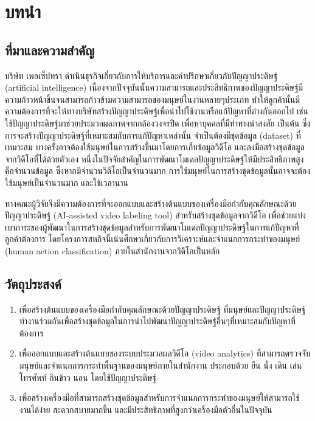 \chapter{บทนำ}
\section{ที่มาและความสำคัญ}
บริษัท เพอเซ็ปทรา ดำเนินธุรกิจเกี่ยวกับการให้บริการและคำปรึกษาเกี่ยวกับปัญญาประดิษฐ์ (artificial intelligence)
เนื่องจากปัจจุบันนั้นความสามารถและประสิทธิภาพของปัญญาประดิษฐ์มีความก้าวหน้าขึ้นจนสามารถก้าวข้ามความสามารถของมนุษย์ในงานหลายๆประเภท
ทำให้ลูกค้านั้นมีความต้องการที่จะให้ทางบริษัทสร้างปัญญาประดิษฐ์เพื่อนำไปใช้งานหรือแก้ปัญหาที่ต่างกันออกไป เช่น ใช้ปัญญาประดิษฐ์มาช่วยประมวลผลภาพจากกล้องวงจรปิด เพื่อหาบุคคลที่มีท่าทางน่าสงสัย เป็นต้น
ซึ่งการจะสร้างปัญญาประดิษฐ์ที่เหมาะสมกับการแก้ปัญหาเหล่านั้น จำเป็นต้องมีชุดข้อมูล (dataset) ที่เหมาะสม บางครั้งอาจต้องใช้มนุษย์ในการสร้างขึ้นมาโดยการเก็บข้อมูลวิดีโอ 
และลงมือสร้างชุดข้อมูลจากวิดีโอที่ได้ด้วยตัวเอง หนึ่งในปัจจัยสำคัญในการพัฒนาโมเดลปัญญาประดิษฐ์ให้มีประสิทธิภาพสูงคือจำนวนข้อมูล
ซึ่งหากมีจำนวนวิดีโอเป็นจำนวนมาก การใช้มนุษย์ในการสร้างชุดข้อมูลนั้นอาจจะต้องใช้มนุษย์เป็นจำนวนมาก และใช้เวลานาน 

ทางคณะผู้วิจัยจึงมีความต้องการที่จะออกแบบและสร้างต้นแบบของเครื่องมือกำกับคุณลักษณะด้วยปัญญาประดิษฐ์ (AI-assisted video labeling tool) สำหรับสร้างชุดข้อมูลจากวิดีโอ 
เพื่อช่วยแบ่งเบาภาระของผู้พัฒนาในการสร้างชุดข้อมูลสำหรับการพัฒนาโมเดลปัญญาประดิษฐ์ในการแก้ปัญหาที่ลูกค้าต้องการ 
โดยโครงการสหกิจนี้เน้นศึกษาเกี่ยวกับการวิเคราะห์และจำแนกการกระทำของมนุษย์ (human action classification) ภายในสำนักงานจากวิดีโอเป็นหลัก

\section{วัตถุประสงค์}
\begin{enumerate}
	\setlength\itemsep{-0.25em}
	\item เพื่อสร้างต้นแบบของเครื่องมือกำกับคุณลักษณะด้วยปัญญาประดิษฐ์ ที่มนุษย์และปัญญาประดิษฐ์ทำงานร่วมกันเพื่อสร้างชุดข้อมูลในการนำไปพัฒนาปัญญาประดิษฐ์อื่นๆที่เหมาะสมกับปัญหาที่ต้องการ
	\item เพื่อออกแบบและสร้างต้นแบบของระบบประมวลผลวิดีโอ (video analytics) ที่สามารถตรวจจับมนุษย์และจำแนกการกระทำพื้นฐานของมนุษย์ภายในสำนักงาน ประกอบด้วย ยืน นั่ง เดิน เล่นโทรศัพท์ กินข้าว นอน โดยใช้ปัญญาประดิษฐ์
	\item เพื่อสร้างเครื่องมือที่สามารถสร้างชุดข้อมูลสำหรับการจำแนกการกระทำของมนุษย์ให้สามารถใช้งานได้ง่าย สะดวกสบายมากขึ้น และมีประสิทธิภาพที่สูงกว่าเครื่องมือตัวอื่นในปัจจุบัน
\end{enumerate}

